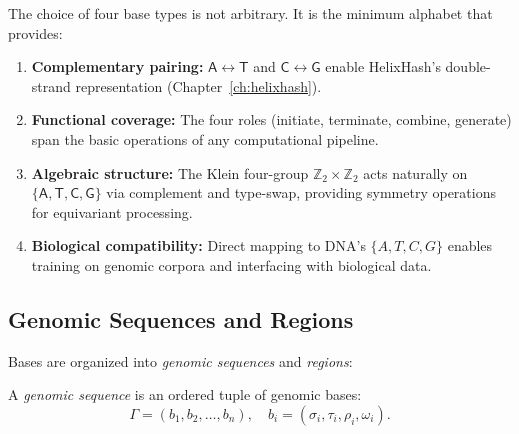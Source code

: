\begin{keyinsight}
The choice of four base types is not arbitrary. It is the minimum alphabet that provides:
\begin{enumerate}[leftmargin=1.5em]
  \item \textbf{Complementary pairing:} $\mathsf{A} \leftrightarrow \mathsf{T}$ and $\mathsf{C} \leftrightarrow \mathsf{G}$ enable HelixHash's double-strand representation (Chapter~\ref{ch:helixhash}).
  \item \textbf{Functional coverage:} The four roles (initiate, terminate, combine, generate) span the basic operations of any computational pipeline.
  \item \textbf{Algebraic structure:} The Klein four-group $\mathbb{Z}_2 \times \mathbb{Z}_2$ acts naturally on $\{\mathsf{A}, \mathsf{T}, \mathsf{C}, \mathsf{G}\}$ via complement and type-swap, providing symmetry operations for equivariant processing.
  \item \textbf{Biological compatibility:} Direct mapping to DNA's $\{A, T, C, G\}$ enables training on genomic corpora and interfacing with biological data.
\end{enumerate}
\end{keyinsight}

\subsection{Genomic Sequences and Regions}

Bases are organized into \emph{genomic sequences} and \emph{regions}:

\begin{definition}
A \emph{genomic sequence} is an ordered tuple of genomic bases:
\begin{equation}
\Gamma = (b_1, b_2, \ldots, b_n), \quad b_i = (\sigma_i, \tau_i, \rho_i, \omega_i).
\end{equation}
\end{definition}

